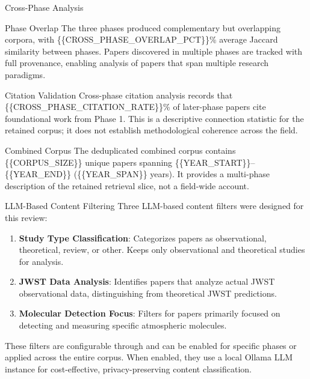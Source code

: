 \documentclass[
  ignorenonframetext,
]{beamer}
\begin{document}
\begin{frame}[allowframebreaks]{Cross-Phase Analysis}
\label{cross-phase-analysis}
\begin{block}{Phase Overlap}
\label{phase-overlap}
The three phases produced complementary but overlapping corpora, with
\{\{CROSS\_PHASE\_OVERLAP\_PCT\}\}\% average Jaccard similarity between
phases. Papers discovered in multiple phases are tracked with full
provenance, enabling analysis of papers that span multiple research
paradigms.
\end{block}

\begin{block}{Citation Validation}
\label{citation-validation}
Cross-phase citation analysis records that
\{\{CROSS\_PHASE\_CITATION\_RATE\}\}\% of later-phase papers cite
foundational work from Phase 1. This is a descriptive connection
statistic for the retained corpus; it does not establish methodological
coherence across the field.
\end{block}

\begin{block}{Combined Corpus}
\label{combined-corpus}
The deduplicated combined corpus contains \{\{CORPUS\_SIZE\}\} unique
papers spanning \{\{YEAR\_START\}\}--\{\{YEAR\_END\}\}
(\{\{YEAR\_SPAN\}\} years). It provides a multi-phase description of the
retained retrieval slice, not a field-wide account.
\end{block}
\end{frame}

\begin{frame}{LLM-Based Content Filtering}
\label{llm-based-content-filtering}
Three LLM-based content filters were designed for this review:

\begin{enumerate}
\item
  \textbf{Study Type Classification}: Categorizes papers as
  observational, theoretical, review, or other. Keeps only observational
  and theoretical studies for analysis.
\item
  \textbf{JWST Data Analysis}: Identifies papers that analyze actual
  JWST observational data, distinguishing from theoretical JWST
  predictions.
\item
  \textbf{Molecular Detection Focus}: Filters for papers primarily
  focused on detecting and measuring specific atmospheric molecules.
\end{enumerate}

These filters are configurable through 
and can be enabled for specific phases or applied across the entire
corpus. When enabled, they use a local Ollama LLM instance for
cost-effective, privacy-preserving content classification.
\end{frame}
\end{document}
